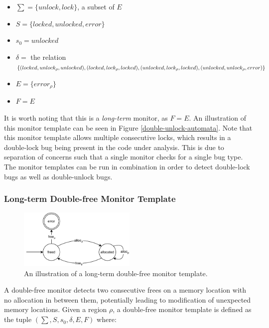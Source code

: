 \begin{itemize}
    \item $\sum = \{unlock, lock\}$, a subset of $E$
    \item $S = \{ locked, unlocked, error \}$
    \item $s_0 = unlocked$ 
    \item $\delta =$ the relation $\{(locked, unlock_\rho, unlocked), (locked, lock_\rho, locked), \\
        (unlocked, lock_\rho, locked), (unlocked, unlock_\rho, error)\}$ 
    \item $E = \{ error_\rho \}$
    \item $F = E$
\end{itemize}

\noindent It is worth noting that this is a \textit{long-term} monitor, as $F = E$. An illustration of this monitor template can be seen in Figure \ref{double-unlock-automata}. Note that this monitor template allows multiple consecutive locks, which results in a double-lock bug being present in the code under analysis. This is due to separation of concerns such that a single monitor checks for a single bug type. The monitor templates can be run in combination in order to detect double-lock bugs as well as double-unlock bugs.

\subsubsection*{Long-term Double-free Monitor Template}

\begin{figure}[H]
    \centering
    \includegraphics[width=0.5\textwidth]{algorithm/figures/double-free}
    \caption{An illustration of a long-term double-free monitor template.}
    \label{double-free-automata}
\end{figure}

A double-free monitor detects two consecutive frees on a memory location with no allocation in between them, potentially leading to modification of unexpected memory locations. Given a region $\rho$, a double-free monitor template is defined as the tuple $(\sum, S, s_0, \delta, E, F)$ where: 

